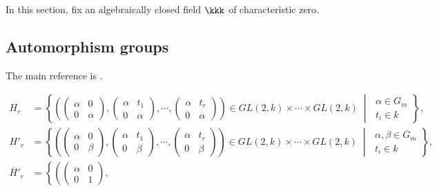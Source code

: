 In this section, fix an algebraically closed field \(\kkk\) of characteristic zero.

\subsection{Automorphism groups}

    The main reference is \cite{Mar71}.

    \[ \begin{aligned}
        H_r &= \left\{ \left(
            \begin{pmatrix}\alpha & 0 \\0 & \alpha\end{pmatrix},
            \begin{pmatrix}\alpha & t_1 \\0 & \alpha\end{pmatrix},
            \cdots,
            \begin{pmatrix}\alpha & t_r \\0 & \alpha\end{pmatrix}
        \right) \in GL(2,k) \times \cdots \times GL(2,k)
        \;\middle|\;
        \begin{array}{l}
            \alpha \in G_m \\
            t_i \in k
        \end{array} \right\} , \\
        H'_r &= \left\{ \left(
            \begin{pmatrix}\alpha & 0 \\0 & \beta\end{pmatrix},
            \begin{pmatrix}\alpha & t_1 \\0 & \beta\end{pmatrix},
            \cdots,
            \begin{pmatrix}\alpha & t_r \\0 & \beta\end{pmatrix}
        \right) \in GL(2,k) \times \cdots \times GL(2,k)
        \;\middle|\;
        \begin{array}{l}
            \alpha, \beta \in G_m \\
            t_i \in k
        \end{array} \right\} , \\
        \overline{H}'_r &= \left\{ \left(
            \begin{pmatrix} \alpha & 0 \\ 0 & 1 \end{pmatrix},

\end{aligned}\]
